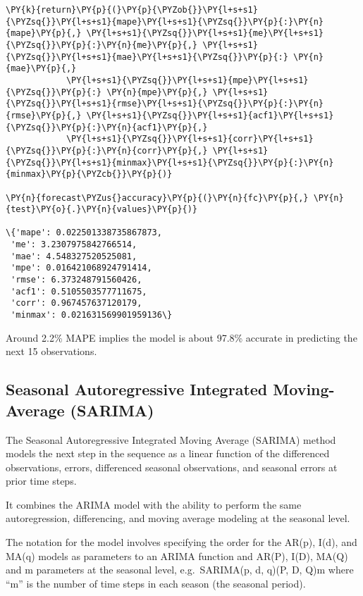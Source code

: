 \begin{codebox}[breakable, size=fbox, boxrule=1pt, pad at break*=1mm,colback=cellbackground, colframe=cellborder]
\begin{Verbatim}[commandchars=\\\{\}]
    \PY{k}{return}\PY{p}{(}\PY{p}{\PYZob{}}\PY{l+s+s1}{\PYZsq{}}\PY{l+s+s1}{mape}\PY{l+s+s1}{\PYZsq{}}\PY{p}{:}\PY{n}{mape}\PY{p}{,} \PY{l+s+s1}{\PYZsq{}}\PY{l+s+s1}{me}\PY{l+s+s1}{\PYZsq{}}\PY{p}{:}\PY{n}{me}\PY{p}{,} \PY{l+s+s1}{\PYZsq{}}\PY{l+s+s1}{mae}\PY{l+s+s1}{\PYZsq{}}\PY{p}{:} \PY{n}{mae}\PY{p}{,} 
            \PY{l+s+s1}{\PYZsq{}}\PY{l+s+s1}{mpe}\PY{l+s+s1}{\PYZsq{}}\PY{p}{:} \PY{n}{mpe}\PY{p}{,} \PY{l+s+s1}{\PYZsq{}}\PY{l+s+s1}{rmse}\PY{l+s+s1}{\PYZsq{}}\PY{p}{:}\PY{n}{rmse}\PY{p}{,} \PY{l+s+s1}{\PYZsq{}}\PY{l+s+s1}{acf1}\PY{l+s+s1}{\PYZsq{}}\PY{p}{:}\PY{n}{acf1}\PY{p}{,} 
            \PY{l+s+s1}{\PYZsq{}}\PY{l+s+s1}{corr}\PY{l+s+s1}{\PYZsq{}}\PY{p}{:}\PY{n}{corr}\PY{p}{,} \PY{l+s+s1}{\PYZsq{}}\PY{l+s+s1}{minmax}\PY{l+s+s1}{\PYZsq{}}\PY{p}{:}\PY{n}{minmax}\PY{p}{\PYZcb{}}\PY{p}{)}

\PY{n}{forecast\PYZus{}accuracy}\PY{p}{(}\PY{n}{fc}\PY{p}{,} \PY{n}{test}\PY{o}{.}\PY{n}{values}\PY{p}{)}

\{'mape': 0.022501338735867873,
 'me': 3.2307975842766514,
 'mae': 4.548327520525081,
 'mpe': 0.016421068924791414,
 'rmse': 6.373248791560426,
 'acf1': 0.5105503577711675,
 'corr': 0.967457637120179,
 'minmax': 0.021631569901959136\}
\end{Verbatim}
\end{codebox}
        
Around 2.2\% MAPE implies the model is about 97.8\% accurate in
predicting the next 15 observations.

\subsection{Seasonal Autoregressive Integrated Moving-Average
(SARIMA)}\label{seasonal-autoregressive-integrated-moving-average-sarima}

The Seasonal Autoregressive Integrated Moving Average (SARIMA) method
models the next step in the sequence as a linear function of the
differenced observations, errors, differenced seasonal observations, and
seasonal errors at prior time steps.

It combines the ARIMA model with the ability to perform the same
autoregression, differencing, and moving average modeling at the
seasonal level.

The notation for the model involves specifying the order for the AR(p),
I(d), and MA(q) models as parameters to an ARIMA function and AR(P),
I(D), MA(Q) and m parameters at the seasonal level, e.g.~SARIMA(p, d,
q)(P, D, Q)m where ``m'' is the number of time steps in each season (the
seasonal period). 

